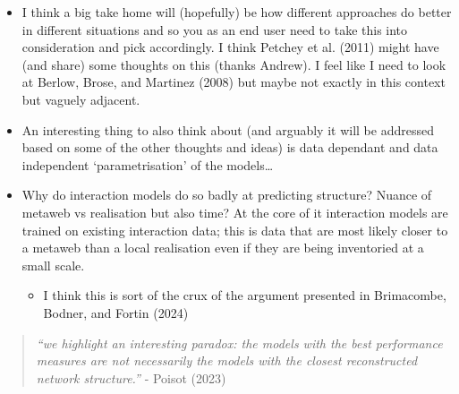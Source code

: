 \documentclass[
  letterpaper,
  DIV=11,
  numbers=noendperiod]{scrartcl}
\providecommand{\tightlist}{%
  \setlength{\itemsep}{0pt}\setlength{\parskip}{0pt}}\usepackage{longtable,booktabs,array}
\begin{document}
\begin{itemize}
\item
  I think a big take home will (hopefully) be how different approaches
  do better in different situations and so you as an end user need to
  take this into consideration and pick accordingly. I think Petchey et
  al. (2011) might have (and share) some thoughts on this (thanks
  Andrew). I feel like I need to look at Berlow, Brose, and Martinez
  (2008) but maybe not exactly in this context but vaguely adjacent.
\item
  An interesting thing to also think about (and arguably it will be
  addressed based on some of the other thoughts and ideas) is data
  dependant and data independent `parametrisation' of the models\ldots{}
\item
  Why do interaction models do so badly at predicting structure? Nuance
  of metaweb vs realisation but also time? At the core of it interaction
  models are trained on existing interaction data; this is data that are
  most likely closer to a metaweb than a local realisation even if they
  are being inventoried at a small scale.

  \begin{itemize}
  \tightlist
  \item
    I think this is sort of the crux of the argument presented in
    Brimacombe, Bodner, and Fortin (2024)
  \end{itemize}
\end{itemize}

\begin{quote}
\emph{``we highlight an interesting paradox: the models with the best
performance measures are not necessarily the models with the closest
reconstructed network structure.''} - Poisot (2023)
\end{quote}
\end{document}
